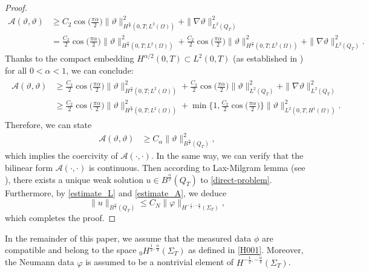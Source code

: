\documentclass[a4paper,12pt,reqno,natbib]{amsart}
\begin{document}
\begin{proof}
\begin{align*}
    \mathcal{A}(\vartheta,\vartheta)
    &\geq C_2\cos\Big( \displaystyle\frac{\pi\alpha}{2} \Big)\| \vartheta\|_{H^{\frac{\alpha}{2}}(0,T;L^2(\Omega))}^2+\|\nabla\vartheta\|_{L^2(Q_T)}^2\\
    &= \frac{C_2}{2}\cos\Big( \displaystyle\frac{\pi\alpha}{2} \Big)\| \vartheta\|_{H^{\frac{\alpha}{2}}(0,T;L^2(\Omega))}^2+\frac{C_2}{2}\cos\Big( \displaystyle\frac{\pi\alpha}{2} \Big)\| \vartheta\|_{H^{\frac{\alpha}{2}}(0,T;L^2(\Omega))}^2+\|\nabla\vartheta\|_{L^2(Q_T)}^2.
\end{align*}
Thanks to the compact embedding $H^{\alpha/2}(0,T) \subset L^2(0,T)$ (as established in \cite{kubica2020time}) for all $0<\alpha<1$, we can conclude:
\begin{align*} %
\begin{split}
    \mathcal{A}(\vartheta,\vartheta)
    &\geq \frac{C_2}{2}\cos\Big( \displaystyle\frac{\pi\alpha}{2} \Big)\| \vartheta\|_{H^{\frac{\alpha}{2}}(0,T;L^2(\Omega))}^2+\frac{C_2}{2}\cos\Big( \displaystyle\frac{\pi\alpha}{2} \Big)\| \vartheta\|_{L^2(Q_T)}^2+\|\nabla\vartheta\|_{L^2(Q_T)}^2\\
    &\geq \frac{C_2}{2}\cos\Big( \displaystyle\frac{\pi\alpha}{2} \Big)\| \vartheta\|_{H^{\frac{\alpha}{2}}(0,T;L^2(\Omega))}^2+\min\Big\{1,\frac{C_2}{2}\cos\Big( \displaystyle\frac{\pi\alpha}{2} \Big)\Big\}\| \vartheta\|_{L^{2}(0,T;H^1(\Omega))}^2.
    \end{split}
\end{align*}
Therefore, we can state
\begin{align} \label{estimate_A}
    \mathcal{A}(\vartheta,\vartheta)
    &\geq  C_\alpha\|\vartheta\|_{B^{\frac{\alpha}{2}}(Q_T)}^2,
\end{align}
which implies the coercivity of $\mathcal{A}(\cdot,\cdot).$ In the same way, we can verify that the bilinear form $\mathcal{A}(\cdot,\cdot)$ is continuous. Then according to Lax-Milgram lemma (see \cite{brezis2010functional}), there exists a unique weak solution $ u\in B^{\frac{\alpha}{2}}(Q_T)$ to \eqref{direct-problem}. Furthermore, by \eqref{estimate_L} and \eqref{estimate_A}, we deduce
\begin{equation}\label{DFHHH}
    \| u\|_{B^{\frac{\alpha}{2}}(Q_T)}\leq C_N\|\varphi\|_{H^{-\frac{1}{2}, -\frac{\alpha}{4} }(\Sigma_T)},
\end{equation}
which completes the proof.
\end{proof}
In the remainder of this paper, we assume that the measured data $\phi$ are compatible and belong to the space ${}_0H^{\frac{1}{2},\frac{\alpha}{4}}\left(\Sigma_{T}\right)$ as defined in \eqref{H001}. Moreover, the Neumann data $\varphi$ is assumed to be a nontrivial element of $H^{-\frac{1}{2},-\frac{\alpha}{4}}\left(\Sigma_{T}\right)$.
\end{document}
